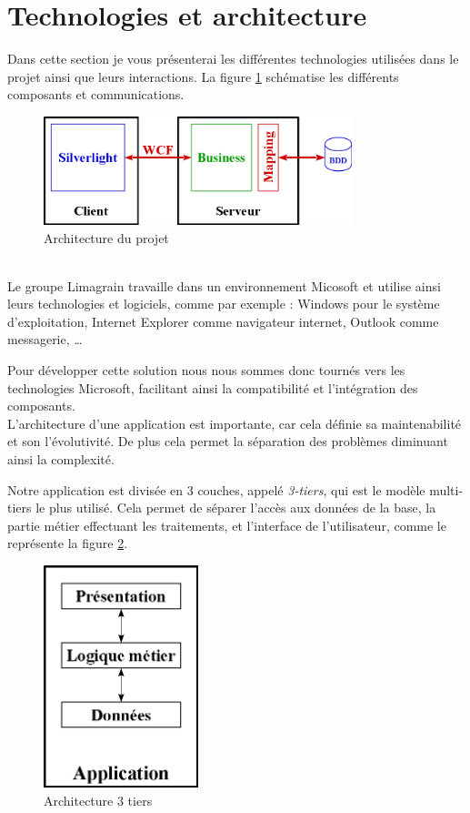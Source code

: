 \section{Technologies et architecture}

Dans cette section je vous présenterai les différentes technologies utilisées dans le projet ainsi que leurs interactions.
La figure \ref{architecture} schématise les différents composants et communications.
\begin{figure}[!h]
	\center
	\includegraphics[width=0.8\textwidth]{img/architecture.png}
	\caption{Architecture du projet}
	\label{architecture}
\end{figure}
~~\\

Le groupe Limagrain travaille dans un environnement Micosoft et utilise ainsi leurs technologies et logiciels, comme par exemple : Windows pour le système d'exploitation, Internet Explorer comme navigateur internet, Outlook comme messagerie, \ldots

Pour développer cette solution nous nous sommes donc tournés vers les technologies Microsoft, facilitant ainsi la compatibilité et l'intégration des composants.
\\

L'architecture d'une application est importante, car cela définie sa maintenabilité et son l'évolutivité.
De plus cela permet la séparation des problèmes diminuant ainsi la complexité.

Notre application est divisée en 3 couches, appelé \textit{3-tiers}, qui est le modèle multi-tiers le plus utilisé.
Cela permet de séparer l'accès aux données de la base, la partie métier effectuant les traitements, et l'interface de l'utilisateur, comme le représente la figure \ref{architecture_3_tiers}.
\begin{figure}[!h]
	\center
	\includegraphics[width=0.4\textwidth]{img/architecture_3_tiers.png}
	\caption{Architecture 3 tiers}
	\label{architecture_3_tiers}
\end{figure}

